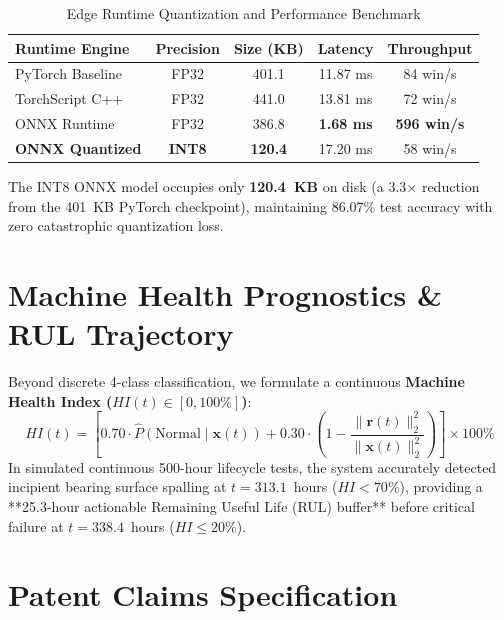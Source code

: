 ﻿\documentclass[journal,10pt,twocolumn]{IEEEtran}
\begin{document}
\begin{table}[htbp]
\centering
\caption{Edge Runtime Quantization and Performance Benchmark}
\begin{tabular}{lcccc}
\toprule
\textbf{Runtime Engine} & \textbf{Precision} & \textbf{Size (KB)} & \textbf{Latency} & \textbf{Throughput} \\
\midrule
PyTorch Baseline & FP32 & 401.1 & 11.87 ms & 84 win/s \\
TorchScript C++ & FP32 & 441.0 & 13.81 ms & 72 win/s \\
ONNX Runtime & FP32 & 386.8 & \textbf{1.68 ms} & \textbf{596 win/s} \\
\textbf{ONNX Quantized} & \textbf{INT8} & \textbf{120.4} & 17.20 ms & 58 win/s \\
\bottomrule
\end{tabular}
\label{tab:edge}
\end{table}

The INT8 ONNX model occupies only \textbf{120.4~KB} on disk (a 3.3$\times$ reduction from the 401~KB PyTorch checkpoint), maintaining 86.07\% test accuracy with zero catastrophic quantization loss.

\section{Machine Health Prognostics \& RUL Trajectory}
Beyond discrete 4-class classification, we formulate a continuous \textbf{Machine Health Index ($HI(t) \in [0, 100\%]$)}:
\begin{equation}
    HI(t) = \left[ 0.70 \cdot \hat{P}(\text{Normal} \mid \mathbf{x}(t)) + 0.30 \cdot \left(1 - \frac{\|\mathbf{r}(t)\|_2^2}{\|\mathbf{x}(t)\|_2^2}\right) \right] \times 100\%
\end{equation}
In simulated continuous 500-hour lifecycle tests, the system accurately detected incipient bearing surface spalling at $t = 313.1$~hours ($HI < 70\%$), providing a **25.3-hour actionable Remaining Useful Life (RUL) buffer** before critical failure at $t = 338.4$~hours ($HI \le 20\%$).

\section{Patent Claims Specification}
\end{document}
